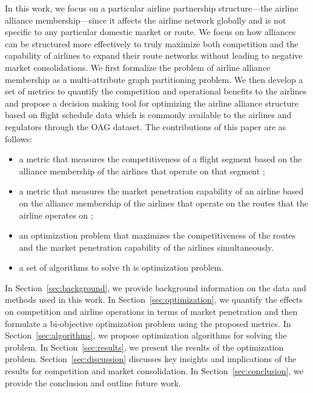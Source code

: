 \documentclass[preprint,times]{elsarticle}
\def\mfabian#1{{\color{black} #1}}
\begin{document}
In this work, we focus on a particular airline partnership structure—the airline alliance membership—since it affects the airline network globally and is not specific to any particular domestic market or route.
We focus on how alliances can be structured more effectively to truly maximize both competition and the capability of airlines to expand their route networks without leading to negative market consolidations.
%
We first formalize the problem of airline alliance membership as a multi-attribute graph partitioning problem. We then develop a set of metrics to quantify the competition and operational benefits to the airlines and propose a decision making tool for optimizing the airline alliance structure based on flight schedule data which is commonly available to the airlines and regulators through the \ac{OAG} dataset.
%
The contributions of this paper are as follows:
%
\begin{itemize}
	\item a metric that measures the competitiveness of a flight segment based on the alliance membership of the airlines that operate on that segment\mfabian{;}
	\item a metric that measures the market penetration capability of an airline based on the alliance membership of the airlines that operate on the routes that the airline operates on\mfabian{;}
	\item an optimization problem that maximizes the competitiveness of the routes and the market penetration capability of the airlines simultaneously.
	\item a set of algorithms to solve th\mfabian{is} optimization problem.
\end{itemize}

In Section~\ref{sec:background}, we provide background information on the data and methods used in this work. In Section~\ref{sec:optimization}, we quantify the effects on competition and airline operations in terms of market penetration and then formulate a bi-objective optimization problem using the proposed metrics. In Section~\ref{sec:algorithms}, we propose optimization algorithms for solving the problem. In Section~\ref{sec:results}, we present the results of the optimization problem. Section~\ref{sec:discussion} discusses key insights and implications of the results for competition and market consolidation. In Section~\ref{sec:conclusion}, we provide the conclusion and outline future work.
\end{document}
